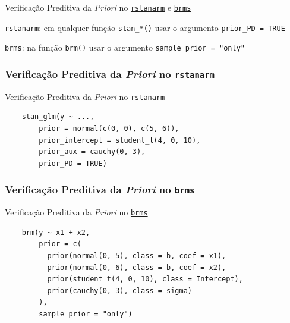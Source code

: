 \begin{frame}{Verificação Preditiva da \textit{Priori} no \href{http://mc-stan.org/rstanarm/}{\texttt{rstanarm}} e \href{https://paul-buerkner.github.io/brms/}{\texttt{brms}}}
    \begin{vfilleditems}
        \item \texttt{rstanarm}: em qualquer função \lstinline!stan_*()! usar o argumento \lstinline!prior_PD = TRUE!
        \item \texttt{brms}: na função \lstinline!brm()! usar o argumento \lstinline!sample_prior = "only"!
    \end{vfilleditems}
\end{frame}

\subsubsection{Verificação Preditiva da \textit{Priori} no \texttt{rstanarm}}
\begin{frame}[fragile]{Verificação Preditiva da \textit{Priori} no \href{http://mc-stan.org/rstanarm/}{\texttt{rstanarm}}}
    \begin{lstlisting}
    stan_glm(y ~ ...,
        prior = normal(c(0, 0), c(5, 6)),
        prior_intercept = student_t(4, 0, 10),
        prior_aux = cauchy(0, 3),
        prior_PD = TRUE)
    \end{lstlisting}
\end{frame}
\subsubsection{Verificação Preditiva da \textit{Priori} no \texttt{brms}}
\begin{frame}[fragile]{Verificação Preditiva da \textit{Priori} no \href{https://paul-buerkner.github.io/brms/}{\texttt{brms}}}
    \begin{lstlisting}
    brm(y ~ x1 + x2,
        prior = c(
          prior(normal(0, 5), class = b, coef = x1),
          prior(normal(0, 6), class = b, coef = x2),
          prior(student_t(4, 0, 10), class = Intercept),
          prior(cauchy(0, 3), class = sigma)
        ),
        sample_prior = "only")
    \end{lstlisting}
\end{frame}

